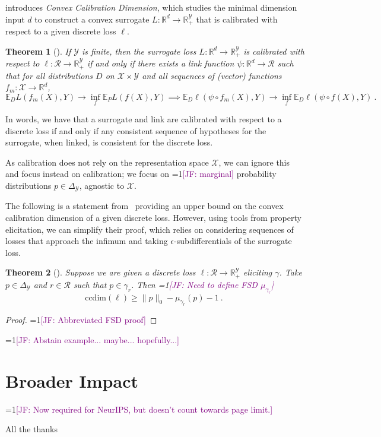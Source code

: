 \documentclass{article}
\newcommand{\Comments}{1}
\newcommand{\mynote}[2]{\ifnum\Comments=1\textcolor{#1}{#2}\fi}
\newcommand{\jessie}[1]{\mynote{purple}{[JF: #1]}}
\newcommand{\reals}{\mathbb{R}}
\newcommand{\simplex}{\Delta_\Y}
\newcommand{\ccdim}{\mathrm{ccdim}}
\newcommand{\E}{\mathbb{E}}
\newcommand{\R}{\mathcal{R}}
\newcommand{\X}{\mathcal{X}}
\newcommand{\Y}{\mathcal{Y}}
\newtheorem{theorem}{Theorem}
\begin{document}
\cite{ramaswamy2016convex} introduces \emph{Convex Calibration Dimension}, which studies the minimal dimension input $d$ to construct a convex surrogate $L : \reals^d \to \reals^\Y_+$ that is calibrated with respect to a given discrete loss $\ell$.

\begin{theorem}[\cite{ramaswamy2016convex}]
	If $\Y$ is finite, then the surrogate loss $L:\reals^d \to \reals^\Y_+$ is calibrated with respect to $\ell: \R \to \reals^\Y_+$ if and only if there exists a link function $\psi : \reals^d \to \R$ such that for all distributions $D$ on $\X \times\Y$ and all sequences of (vector) functions $f_m : \X \to \reals^d$,
	\begin{equation*}
	\E_D L(f_m(X), Y) \to \inf_f \E_P L(f(X), Y) \implies \E_D \ell(\psi  \circ f_m(X), Y) \to \inf_f \E_D \ell(\psi \circ f(X), Y)~.~
	\end{equation*}
\end{theorem}
In words, we have that a surrogate and link are calibrated with respect to a discrete loss if and only if any consistent sequence of hypotheses for the surrogate, when linked, is consistent for the discrete loss.

As calibration does not rely on the representation space $\X$, we can ignore this and focus instead on calibration; we focus on \jessie{marginal} probability distributions $p \in \simplex$, agnostic to $\X$.


The following is a statement from~\cite{ramaswamy2016convex} providing an upper bound on the convex calibration dimension of a given discrete loss.
However, using tools from property elicitation, we can simplify their proof, which relies on considering sequences of losses that approach the infimum and taking $\epsilon$-subdifferentials of the surrogate loss.

\begin{theorem}[\cite{ramaswamy2016convex}]
	Suppose we are given a discrete loss $\ell:\R \to \reals^\Y_+$ eliciting $\gamma$.
	Take $p \in \simplex$ and $r \in \R$ such that $p \in \gamma_r$.
	Then \jessie{Need to define FSD $\mu_{\gamma_r}$}
	\begin{equation}
	\ccdim(\ell) \geq \|p\|_0 - \mu_{\gamma_r}(p) - 1~.~
	\end{equation}
\end{theorem}
\begin{proof}
	\jessie{Abbreviated FSD proof}
\end{proof}

\jessie{Abstain example... maybe... hopefully...}

\newpage

\section*{Broader Impact}
\jessie{Now required for NeurIPS, but doesn't count towards page limit.}

\begin{ack}
All the thanks
\end{ack}



\end{document}
